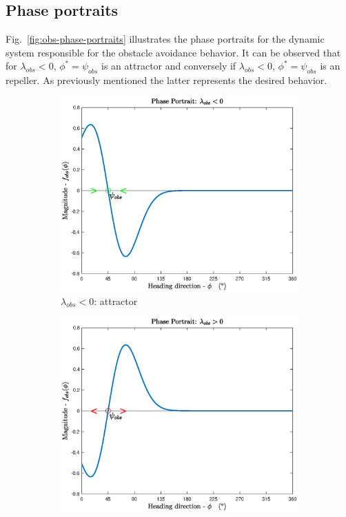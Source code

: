 \subsection{Phase portraits}%
\label{sec:phase-portraits-obs}
Fig.~\ref{fig:obs-phase-portraits} illustrates the phase portraits for the
dynamic system responsible for the obstacle avoidance behavior. It can be
observed that for $\lambda_{obs} < 0$, $\phi^* = \psi_{obs}$ is an attractor and
conversely if $\lambda_{obs} < 0$, $\phi^* = \psi_{obs}$ is an repeller. As
previously mentioned the latter represents the desired behavior.
%
\begin{figure}[!hbt]
\centering
\begin{subfigure}{.5\textwidth}
  \centering
  \includegraphics[width=1.0\textwidth]{./img/obs-phase-portrait-1.eps}
  \caption{$\lambda_{obs} < 0$: attractor}%
  \label{fig:obs-phase-port-1}
\end{subfigure}%
\begin{subfigure}{.5\textwidth}
  \centering
  \includegraphics[width=1.0\textwidth]{./img/obs-phase-portrait-2.eps}

\end{subfigure}
\end{figure}
